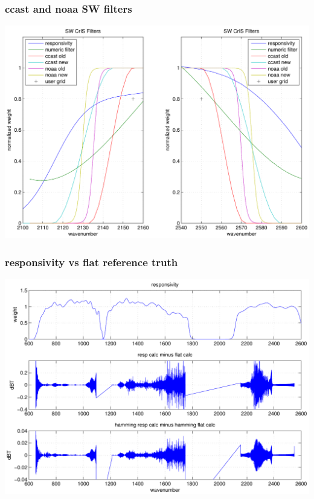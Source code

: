 \documentclass[11pt]{beamer}
\begin{document}
\begin{frame}
\frametitle{ccast and noaa SW filters}
\begin{center}
  \includegraphics[scale=0.5]{figures/show_filts_SW.pdf}
\end{center}
\end{frame}
\begin{frame}
\frametitle{responsivity vs flat reference truth}
\begin{center}
  \includegraphics[scale=0.5]{figures/resp_flat_diff.pdf}
\end{center}
\end{frame}
\end{document}
